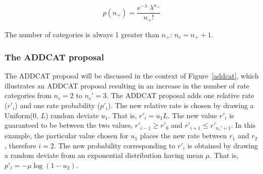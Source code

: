 \documentclass[12pt]{article}
\newcommand{\ncat}{n_c}
\newcommand{\nxtra}{n_{+}}
\newcommand{\newprobmean}{\mu}
\begin{document}
\[ p(\nxtra) = \frac{ e^{-\lambda} \; \lambda^{\nxtra} }{ {\nxtra}! }  \]

The number of categories is always 1 greater than $\nxtra$: $\ncat = \nxtra + 1$.

%


\subsubsection{The ADDCAT proposal}

The ADDCAT proposal will be discussed in the context of Figure~\ref{addcat}, which illustrates an ADDCAT proposal resulting in an increase in the number of rate categories from $\ncat = 2$ to $\ncat' = 3$. The ADDCAT proposal adds one relative rate ($r'_i$) and one rate probability ($p'_i$). The new relative rate is chosen by drawing a Uniform(0, $L$) random deviate $u_1$. That is, $r'_i = u_1 L$. The new value $r'_i$ is guaranteed to be between the two values, $r'_{i-1} \ge r'_0$ and $r'_{i+1} \le r'_{\ncat'+1}$. In this example, the particular value chosen for $u_1$ places the new rate between $r_1$ and $r_2$, therefore $i=2$. The new probability corresponding to $r'_i$ is obtained by drawing a random deviate from an exponential distribution having mean $\newprobmean$. That is, $p'_i = -\newprobmean \log(1 - u_2)$.
\end{document}
